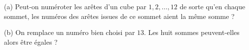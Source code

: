 (a) Peut-on numéroter les arêtes d'un cube par $1, 2, \ldots, 12$ de sorte qu'en chaque sommet, les numéros des arêtes issues de ce sommet aient la même somme ?

(b) On remplace un numéro bien choisi par $13$. Les huit sommes peuvent-elles alors être égales ?
